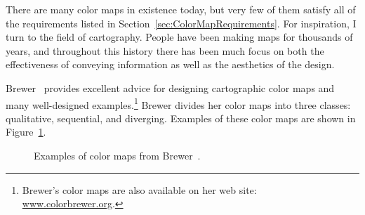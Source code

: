 \documentclass{acmsiggraph}               %
\newcommand{\scite}[1]{~\shortcite{#1}}
\begin{document}
There are many color maps in existence today, but very few of them satisfy
all of the requirements listed in Section~\ref{sec:ColorMapRequirements}.
For inspiration, I turn to the field of cartography.  People
have been making maps for thousands of years, and throughout this history
there has been much focus on both the effectiveness of
conveying information as well as the aesthetics of the design.

Brewer\scite{Brewer05} provides excellent advice for designing cartographic
color maps and many well-designed examples.\footnote{Brewer's color maps
are also available on her web site:
\href{http://www.colorbrewer.org}{www.colorbrewer.org}.} Brewer divides her
color maps into three classes: qualitative, sequential, and diverging.
Examples of these color maps are shown in Figure~\ref{fig:BrewerExamples}.

\begin{figure}
  \centering
  \quad
  \quad
  \caption{Examples of color maps from Brewer\scite{Brewer05}.}
  \label{fig:BrewerExamples}
\end{figure}
\end{document}
